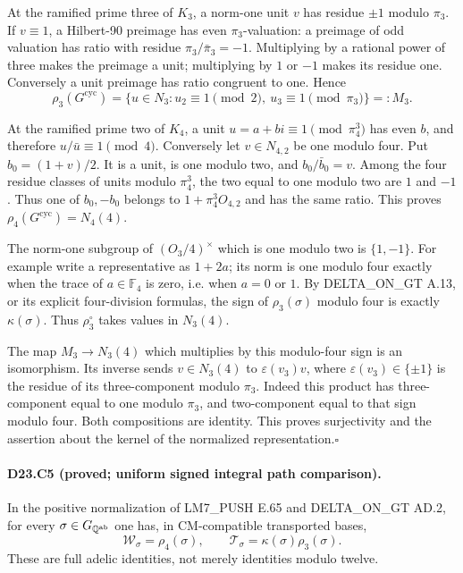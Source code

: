 At the ramified prime three of $K_3$, a norm-one unit $v$ has
residue $\pm1$ modulo $\pi_3$.  If $v\equiv1$, a Hilbert-90
preimage has even $\pi_3$-valuation: a preimage of odd valuation
has ratio with residue $\pi_3/\bar\pi_3=-1$.  Multiplying by
a rational power of three makes the preimage a unit; multiplying
by $1$ or $-1$ makes its residue one.  Conversely a unit preimage
has ratio congruent to one.  Hence
\[
 \rho_3(G^{\mathrm{cyc}})
 =\{u\in N_3:u_2\equiv1\pmod2,
                     \ u_3\equiv1\pmod{\pi_3}\}=:M_3.
\]

At the ramified prime two of $K_4$, a unit
$u=a+bi\equiv1\pmod{\pi_4^3}$ has even $b$, and therefore
$u/\bar u\equiv1\pmod4$.  Conversely let $v\in N_{4,2}$
be one modulo four.  Put $b_0=(1+v)/2$.  It is a unit, is one
modulo two, and $b_0/\bar b_0=v$.  Among the four residue classes
of units modulo $\pi_4^3$, the two equal to one modulo two are
$1$ and $-1$.  Thus one of $b_0,-b_0$ belongs to
$1+\pi_4^3O_{4,2}$ and has the same ratio.  This proves
$\rho_4(G^{\mathrm{cyc}})=N_4(4)$.

The norm-one subgroup of $(O_3/4)^\times$ which is one modulo
two is $\{1,-1\}$.  For example write a representative as
$1+2a$; its norm is one modulo four exactly when the trace of
$a\in\mathbb F_4$ is zero, i.e. when $a=0$ or $1$.
By DELTA\_ON\_GT A.13, or its explicit four-division formulas,
the sign of $\rho_3(\sigma)$ modulo four is exactly
$\kappa(\sigma)$.  Thus $\rho_3^\circ$ takes values in $N_3(4)$.

The map $M_3\to N_3(4)$ which multiplies by this modulo-four
sign is an isomorphism.  Its inverse sends $v\in N_3(4)$ to
$\varepsilon(v_3)v$, where $\varepsilon(v_3)\in\{\pm1\}$ is
the residue of its three-component modulo $\pi_3$.  Indeed this
product has three-component equal to one modulo $\pi_3$, and
two-component equal to that sign modulo four.  Both compositions
are identity.  This proves surjectivity and the assertion about
the kernel of the normalized representation.\hfill$\square$

\paragraph{D23.C5 (proved; uniform signed integral path comparison).}
In the positive normalization of LM7\_PUSH E.65 and
DELTA\_ON\_GT AD.2, for every
$\sigma\in G_{\mathbb Q^{\rm ab}}$ one has, in CM-compatible
transported bases,
\[
 \mathcal W_\sigma=\rho_4(\sigma),\qquad
 \mathcal T_\sigma=\kappa(\sigma)\rho_3(\sigma).
\]
These are full adelic identities, not merely identities modulo twelve.

